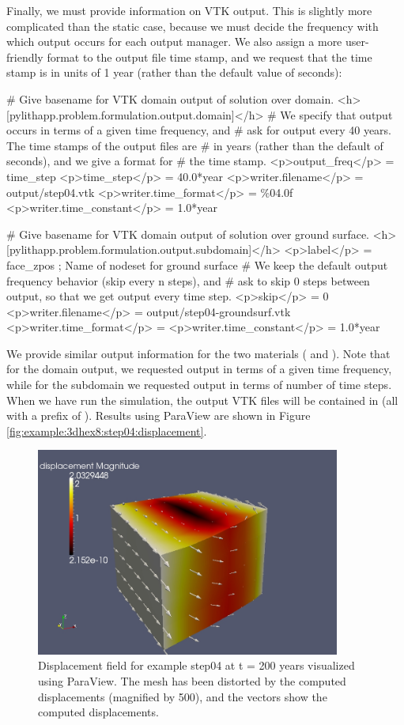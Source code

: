 Finally, we must provide information on VTK output. This is slightly
more complicated than the static case, because we must decide the
frequency with which output occurs for each output manager. We also
assign a more user-friendly format to the output file time stamp,
and we request that the time stamp is in units of 1 year (rather than
the default value of seconds):
\begin{cfg}
# Give basename for VTK domain output of solution over domain.
<h>[pylithapp.problem.formulation.output.domain]</h>
# We specify that output occurs in terms of a given time frequency, and
# ask for output every 40 years. The time stamps of the output files are
# in years (rather than the default of seconds), and we give a format for
# the time stamp.
<p>output_freq</p> = time_step
<p>time_step</p> = 40.0*year
<p>writer.filename</p> = output/step04.vtk
<p>writer.time_format</p> = \%04.0f
<p>writer.time_constant</p> = 1.0*year

# Give basename for VTK domain output of solution over ground surface.
<h>[pylithapp.problem.formulation.output.subdomain]</h>
<p>label</p> = face_zpos ; Name of nodeset for ground surface
# We keep the default output frequency behavior (skip every n steps), and
# ask to skip 0 steps between output, so that we get output every time step.
<p>skip</p> = 0
<p>writer.filename</p> = output/step04-groundsurf.vtk
<p>writer.time_format</p> = %
<p>writer.time_constant</p> = 1.0*year
\end{cfg}
We provide similar output information for the two materials (
and ). Note that for the domain output, we requested
output in terms of a given time frequency, while for the subdomain
we requested output in terms of number of time steps. When we have
run the simulation, the output VTK files will be contained in 
(all with a prefix of ). Results using ParaView are
shown in Figure \vref{fig:example:3dhex8:step04:displacement}.

\begin{figure}
  \includegraphics[width=10cm]{examples/figs/3dhex8_step04-displ-t200}
  \caption{Displacement field for example step04 at t = 200 years
    visualized using ParaView. The mesh has been distorted by the
    computed displacements (magnified by 500), and the vectors show
    the computed displacements.}
  \label{fig:example:3dhex8:step04:displacement}
\end{figure}


